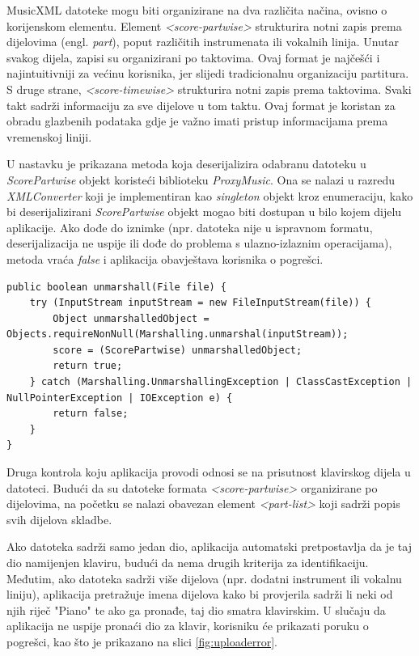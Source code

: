 \documentclass[diplomskirad, upload]{fer}
\begin{document}
MusicXML datoteke mogu biti organizirane na dva različita načina, ovisno o korijenskom elementu. Element \textit{<score-partwise>} strukturira notni zapis prema dijelovima (engl. \textit{part}), poput različitih instrumenata ili vokalnih linija. Unutar svakog dijela, zapisi su organizirani po taktovima. Ovaj format je najčešći i najintuitivniji za većinu korisnika, jer slijedi tradicionalnu organizaciju partitura. S druge strane, \textit{<score-timewise>} strukturira notni zapis prema taktovima. Svaki takt sadrži informaciju za sve dijelove u tom taktu. Ovaj format je koristan za obradu glazbenih podataka gdje je važno imati pristup informacijama prema vremenskoj liniji.

U nastavku je prikazana metoda koja deserijalizira odabranu datoteku u \textit{ScorePartwise} objekt koristeći biblioteku \textit{ProxyMusic}. Ona se nalazi u razredu \textit{XMLConverter} koji je implementiran kao \textit{singleton} objekt kroz enumeraciju, kako bi deserijalizirani \textit{ScorePartwise} objekt mogao biti dostupan u bilo kojem dijelu aplikacije. Ako dođe do iznimke (npr. datoteka nije u ispravnom formatu, deserijalizacija ne uspije ili dođe do problema s ulazno-izlaznim operacijama), metoda vraća \textit{false} i aplikacija obavještava korisnika o pogrešci.

\begin{lstlisting}
public boolean unmarshall(File file) {
	try (InputStream inputStream = new FileInputStream(file)) {
		Object unmarshalledObject = Objects.requireNonNull(Marshalling.unmarshal(inputStream));
		score = (ScorePartwise) unmarshalledObject;
		return true;
	} catch (Marshalling.UnmarshallingException | ClassCastException | NullPointerException | IOException e) {
		return false;
	}
}
\end{lstlisting}

Druga kontrola koju aplikacija provodi odnosi se na prisutnost klavirskog dijela u datoteci. Budući da su datoteke formata \textit{<score-partwise>} organizirane po dijelovima, na početku se nalazi obavezan element \textit{<part-list>} koji sadrži popis svih dijelova skladbe.

Ako datoteka sadrži samo jedan dio, aplikacija automatski pretpostavlja da je taj dio namijenjen klaviru, budući da nema drugih kriterija za identifikaciju. Međutim, ako datoteka sadrži više dijelova (npr. dodatni instrument ili vokalnu liniju), aplikacija pretražuje imena dijelova kako bi provjerila sadrži li neki od njih riječ "Piano" te ako ga pronađe, taj dio smatra klavirskim. U slučaju da aplikacija ne uspije pronaći dio za klavir, korisniku će prikazati poruku o pogrešci, kao što je prikazano na slici \ref{fig:uploaderror}.
\end{document}
